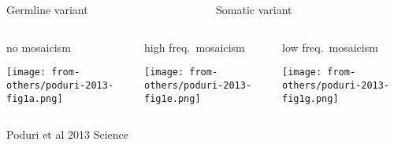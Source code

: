 \documentclass[usenames,dvipsnames]{beamer}
\begin{document}
\begin{frame}
\begin{columns}[t]
\begin{column}{0.3\textwidth}
\begin{center}
Germline variant
\end{center}
\end{column}

\begin{column}{0.7\textwidth}
\begin{center}
Somatic variant
\end{center}
\end{column}
\end{columns}
\begin{columns}[t]
\begin{column}{0.3\textwidth}
\begin{center}
	\footnotesize no mosaicism
\end{center}

\texttt{[image: from-others/poduri-2013-fig1a.png]}
\begin{center}
\end{center}
\end{column}

\begin{column}{0.3\columnwidth}
\begin{center}
	\footnotesize high freq.~mosaicism
\end{center}

\texttt{[image: from-others/poduri-2013-fig1e.png]}
\end{column}
\begin{column}{0.3\columnwidth}
\begin{center}
	\footnotesize low freq.~mosaicism
\end{center}

\texttt{[image: from-others/poduri-2013-fig1g.png]}
\end{column}
\end{columns}
{\tiny Poduri et al 2013 Science}
\end{frame}

\end{document}
